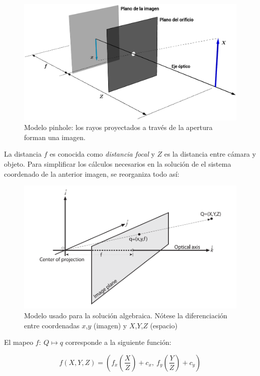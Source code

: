 \documentclass[11pt]{article}
\makeatletter
\def\maxwidth{\ifdim\Gin@nat@width>\linewidth\linewidth
    \else\Gin@nat@width\fi}
\let\Oldincludegraphics\includegraphics
\renewcommand{\includegraphics}[1]{\Oldincludegraphics[width=.8\maxwidth]{#1}}
\makeatother
\begin{document}
    \begin{figure}[htbp]
\centering
\includegraphics{img/1-fig1.png}
\caption{Modelo pinhole: los rayos proyectados a través de la apertura
forman una imagen.}
\end{figure}

    La distancia \(f\) es conocida como \emph{distancia focal} y \(Z\) es la
distancia entre cámara y objeto. Para simplificar los cálculos
necesarios en la solución de el sistema coordenado de la anterior
imagen, se reorganiza todo así:

    \begin{figure}[htbp]
\centering
\includegraphics{img/1-fig2.png}
\caption{Modelo usado para la solución algebraica. Nótese la
diferenciación entre coordenadas \(x\),\(y\) (imagen) y
\(X\),\(Y\),\(Z\) (espacio)}
\end{figure}

    El mapeo \(f:\ Q \mapsto q\) corresponde a la siguiente función:

    \[f\left(X,Y,Z\right) = \left(f_x\left(\frac{X}{Z}\right)+c_x,\ f_y\left(\frac{Y}{Z}\right)+c_y\right)\]
\end{document}
